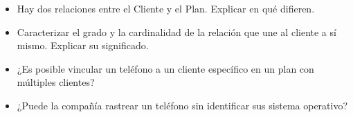 \documentclass[letterpaper,11pt]{article}
\begin{document}
\begin{itemize}
    \item Hay dos relaciones entre el Cliente y el Plan. Explicar en qué 
    difieren.

    \item Caracterizar el grado y la cardinalidad de la relación que une al 
    cliente a sí mismo. Explicar su significado.

    \item ¿Es posible vincular un teléfono a un cliente específico en un plan 
    con múltiples clientes?

    \item ¿Puede la compañía rastrear un teléfono sin identificar sus sistema 
    operativo?
\end{itemize}
\end{document}
